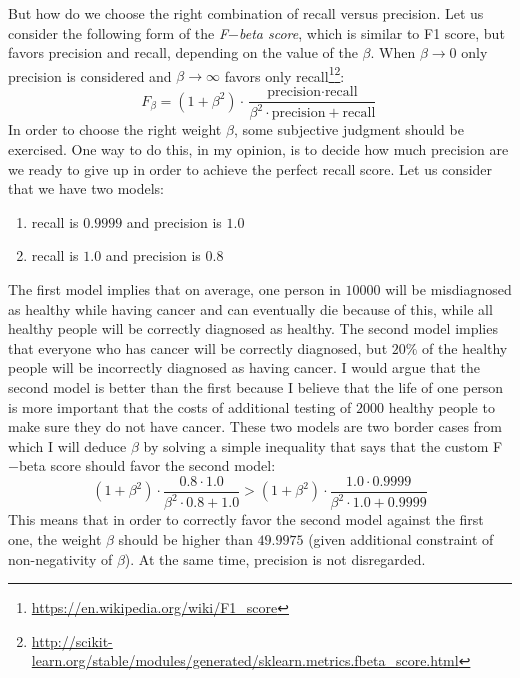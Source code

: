 \documentclass[10pt, a4paper]{article}
\begin{document}
But how do we choose the right combination of recall versus precision. Let us consider the following form of the \textit{F$-$beta score}, which is similar to F1 score, but favors precision and recall, depending on the value of the $\beta$. When $\beta \rightarrow 0$ only precision is considered and $\beta \rightarrow \infty$ favors only recall\footnote{\scriptsize \url{https://en.wikipedia.org/wiki/F1_score}}\footnote{\scriptsize \url{http://scikit-learn.org/stable/modules/generated/sklearn.metrics.fbeta_score.html}}:
\begin{equation*}
	F_\beta = (1+\beta^2) \cdot \frac{\text{precision} \cdot \text{recall}}{\beta^2 \cdot \text{precision} + \text{recall}}
\end{equation*}
In order to choose the right weight $\beta$, some subjective judgment should be exercised. One way to do this, in my opinion, is to decide how much precision are we ready to give up in order to achieve the perfect recall score. Let us consider that we have two models:
\begin{enumerate}
	\item recall is $0.9999$ and precision is $1.0$
	\item recall is $1.0$ and precision is $0.8$
\end{enumerate}
The first model implies that on average, one person in $10 000$ will be misdiagnosed as healthy while having cancer and can eventually die because of this, while all healthy people will be correctly diagnosed as healthy. The second model implies that everyone who has cancer will be correctly diagnosed, but $20\%$ of the healthy people will be incorrectly diagnosed as having cancer. I would argue that the second model is better than the first because I believe that the life of one person is more important that the costs of additional testing of $2000$ healthy people to make sure they do not have cancer. These two models are two border cases from which I will deduce $\beta$ by solving a simple inequality that says that the custom F$-$beta score should favor the second model:
\begin{equation*}
		(1+\beta^2) \cdot \frac{0.8 \cdot 1.0}{\beta^2 \cdot 0.8 + 1.0} > (1+\beta^2) \cdot \frac{1.0 \cdot 0.9999}{\beta^2 \cdot 1.0 + 0.9999}
\end{equation*}
This means that in order to correctly favor the second model against the first one, the weight $\beta$ should be higher than $49.9975$ (given additional constraint of non-negativity of $\beta$). At the same time, precision is not disregarded.
\end{document}
